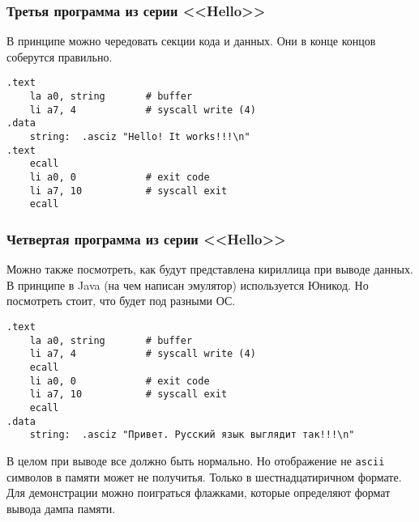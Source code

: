 \subsubsection{Третья программа из серии <<Hello>>}
В принципе можно чередовать секции кода и данных. Они в конце концов соберутся правильно.
\begin{verbatim}
.text
    la a0, string       # buffer
    li a7, 4            # syscall write (4)
.data
    string:  .asciz "Hello! It works!!!\n"
.text
    ecall
    li a0, 0            # exit code
    li a7, 10           # syscall exit
    ecall
\end{verbatim}

\subsubsection{Четвертая программа из серии <<Hello>>}
Можно также посмотреть, как будут представлена кириллица при выводе данных. В принципе в Java (на чем написан эмулятор) используется Юникод. Но посмотреть стоит, что будет под разными ОС.
\begin{verbatim}
.text
    la a0, string       # buffer
    li a7, 4            # syscall write (4)
    ecall
    li a0, 0            # exit code
    li a7, 10           # syscall exit
    ecall
.data
    string:  .asciz "Привет. Русский язык выглядит так!!!\n"
\end{verbatim}
В целом при выводе все должно быть нормально. Но отображение не \verb|ascii| символов в памяти может не получитья. Только в шестнадцатиричном формате. Для демонстрации можно поиграться флажками, которые определяют формат вывода дампа памяти.


